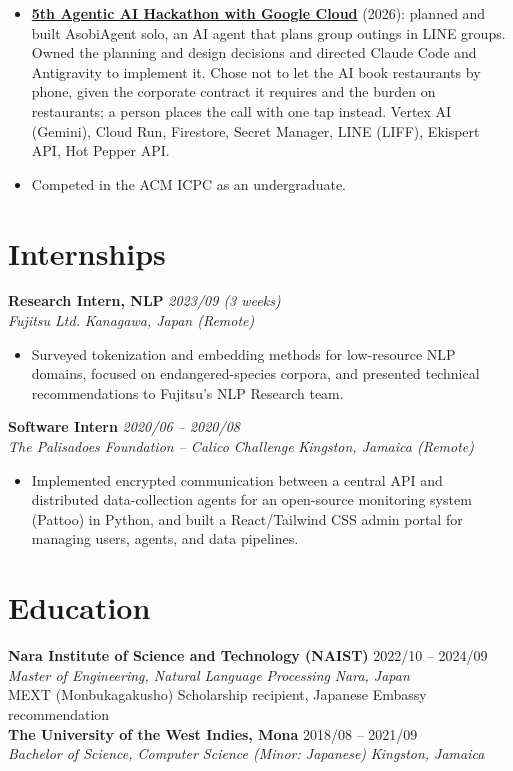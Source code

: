 \documentclass[10pt,letterpaper]{article}
\newcommand{\extlink}[2]{\href{#1}{\color{accent}#2}}
\newcommand{\role}[4]{%
  \textbf{#1} \hfill \textit{#3}\\
  \textit{#2} \hfill \textit{#4}\\[0pt]
}
\begin{document}
\begin{itemize}
\begin{itemize}
        Actions (Brakeman, bundler-audit, RuboCop).
    \end{itemize}
  \item \extlink{https://zenn.dev/hackathons/google-cloud-japan-ai-hackathon-vol5/projects/bf01c70153667d}{\textbf{5th
    Agentic AI Hackathon with Google Cloud}} (2026): planned and built AsobiAgent solo, an AI agent
    that plans group outings in LINE groups. Owned the planning and design decisions and directed
    Claude Code and Antigravity to implement it. Chose not to let the AI book restaurants by phone,
    given the corporate contract it requires and the burden on restaurants; a person places the call
    with one tap instead. Vertex AI (Gemini), Cloud Run, Firestore, Secret Manager, LINE (LIFF),
    Ekispert API, Hot Pepper API.
  \item Competed in the ACM ICPC as an undergraduate.
\end{itemize}

\section*{Internships}

\role{Research Intern, NLP}{Fujitsu Ltd.}{2023/09 (3 weeks)}{Kanagawa, Japan (Remote)}
\begin{itemize}
  \item Surveyed tokenization and embedding methods for low-resource NLP domains, focused on
    endangered-species corpora, and presented technical recommendations to Fujitsu's NLP Research
    team.
\end{itemize}

\vspace{0pt}
\role{Software Intern}{The Palisadoes Foundation -- Calico Challenge}{2020/06 -- 2020/08}{Kingston, Jamaica (Remote)}
\begin{itemize}
  \item Implemented encrypted communication between a central API and distributed data-collection
    agents for an open-source monitoring system (Pattoo) in Python, and built a React/Tailwind CSS
    admin portal for managing users, agents, and data pipelines.
\end{itemize}

\section*{Education}
\textbf{Nara Institute of Science and Technology (NAIST)} \hfill 2022/10 -- 2024/09\\
\textit{Master of Engineering, Natural Language Processing} \hfill \textit{Nara, Japan}\\
MEXT (Monbukagakusho) Scholarship recipient, Japanese Embassy recommendation\\[0pt]
\textbf{The University of the West Indies, Mona} \hfill 2018/08 -- 2021/09\\
\textit{Bachelor of Science, Computer Science (Minor: Japanese)} \hfill \textit{Kingston, Jamaica}
\end{document}
